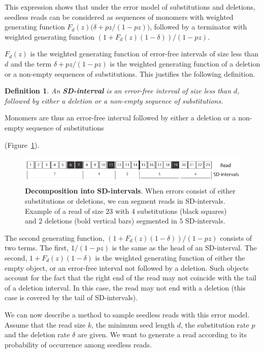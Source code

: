 \documentclass{article}
\newtheorem{definition}{Definition}
\begin{document}
This expression shows that under the error model of substitutions and
deletions, seedless reads can be considered as sequences of monomers with
weighted generating function $F_d(z)\big( \delta + pz / (1-pz) \big)$,
followed by a terminator with weighted generating function
$(1+F_d(z)(1-\delta))/(1-pz)$.

$F_d(z)$ is the weighted generating function of error-free intervals of
size less than $d$ and the term $\delta + pz/(1-pz)$ is the weighted
generating function of a deletion or a non-empty sequences of
substitutions. This justifies the following definition.

\begin{definition}
An \textbf{SD-interval} is an error-free interval of size less than $d$,
followed by either a deletion or a non-empty sequence of substitutions.
\end{definition}

Monomers are thus an error-free interval followed by either
a deletion or a non-empty sequence of substitutions

(Figure~\ref{fig:sketchdelint}).
\begin{figure}[h]
\centering
\includegraphics[scale=0.90]{sketch_SD_intervals.pdf}
\caption{\textbf{Decomposition into SD-intervals}. When
errors consist of either substitutions or deletions, we can segment reads
in SD-intervals. Example of a read of size $23$ with $4$ substitutions
(black squares) and $2$ deletions (bold vertical bars) segmented in $5$
SD-intervals.}
\label{fig:sketchdelint}
\end{figure}

The second generating function, $(1+F_d(z)(1-\delta))/(1-pz)$ consists of
two terms. The first, $1/(1-pz)$ is the same as the head of an
SD-interval. The second, $1+F_d(z)(1-\delta)$ is the weighted generating
function of either the empty object, or an error-free interval not
followed by a deletion. Such objects account for the fact that the right
end of the read may not coincide with the tail of a deletion interval. In
this case, the read may not end with a deletion (this case is covered by
the tail of SD-intervals).

We can now describe a method to sample seedless reads with this error
model. Assume that the read size $k$, the minimum seed length $d$, the
substitution rate $p$ and the deletion rate $\delta$ are given. We want to
generate a read according to its probability of occurrence among seedless
reads.
\end{document}
